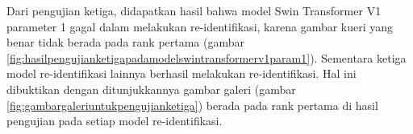 Dari pengujian ketiga, didapatkan hasil bahwa model Swin Transformer V1 parameter 1 gagal dalam melakukan re-identifikasi, 
karena gambar kueri yang benar tidak berada pada rank pertama (gambar 
\ref{fig:hasilpengujianketigapadamodelswintransformerv1param1}). Sementara ketiga model re-identifikasi lainnya berhasil 
melakukan re-identifikasi. Hal ini dibuktikan dengan ditunjukkannya gambar galeri (gambar \ref{fig:gambargaleriuntukpengujianketiga})
berada pada rank pertama di hasil pengujian pada setiap model re-identifikasi.







